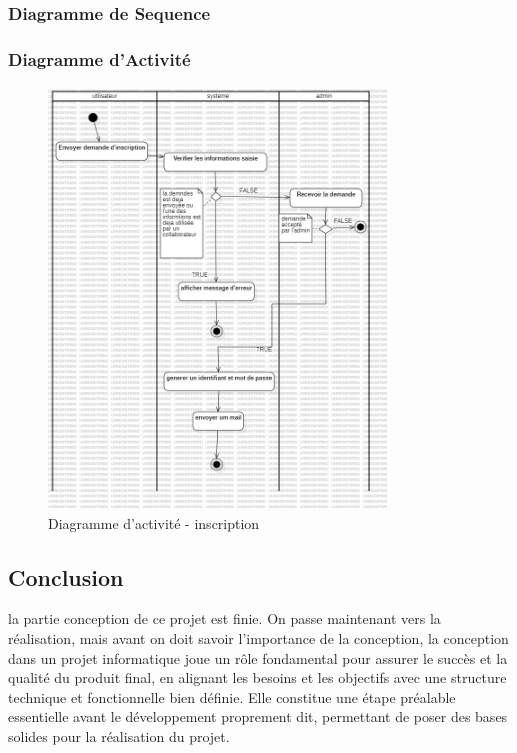 \documentclass{article}
\begin{document}
            \subsubsection{Diagramme de Sequence}

            \subsubsection{Diagramme d'Activité}
                \begin{figure}[h!]
                    \centering
                    \includegraphics[width=0.8\textwidth]{assets/diagrammes/ActivityDiagram.jpg}
                    \caption{Diagramme d'activité - inscription}
                \end{figure}
                \FloatBarrier
        
        \subsection{Conclusion}
            la partie conception de ce projet est finie. On passe maintenant vers la réalisation, mais avant on doit savoir l'importance de la conception,
            la conception dans un projet informatique joue un rôle fondamental pour assurer le succès et la qualité du produit final, 
            en alignant les besoins et les objectifs avec une structure technique et fonctionnelle bien définie. 
            Elle constitue une étape préalable essentielle avant le développement proprement dit, 
            permettant de poser des bases solides pour la réalisation du projet.
            
\end{document}
